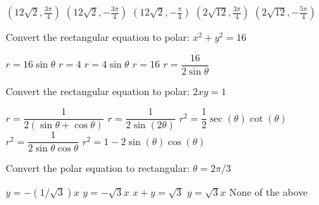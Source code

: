 \documentclass[11pt]{exam}
\begin{document}
\begin{questions}
\begin{minipage}{\linewidth}
\begin{choices}
	\choice $\left(12 \sqrt{2},\frac{3 \pi }{4}\right)$
	\CorrectChoice $\left(12 \sqrt{2},-\frac{3 \pi }{4}\right)$
	\choice $\left(12 \sqrt{2},-\frac{\pi }{4}\right)$
	\choice $\left(2 \sqrt{12},\frac{3 \pi }{4}\right)$
	\choice $\left(2 \sqrt{12},-\frac{5 \pi }{4}\right)$
\end{choices} \answerline

\end{minipage}

\begin{minipage}{\linewidth}



\question Convert the rectangular equation to polar: $x^2 + y^2 = 16$

\begin{choices}
	\choice $r = 16 \sin \theta$
	\CorrectChoice $r = 4$
	\choice $r = 4 \sin \theta$
	\choice $r=16$
	\choice $r = \dfrac{16}{2\sin\theta}$
\end{choices} \answerline
\end{minipage}

\begin{minipage}{\linewidth}



\question Convert the rectangular equation to polar: $2xy=1$

\begin{choices}
	\choice $r = \dfrac{1}{2(\sin\theta + \cos\theta)}$
	\choice $r = \dfrac{1}{2\sin(2\theta)}$
	\choice $r^2 = \dfrac{1}{2}\sec(\theta)\cot(\theta)$
	\CorrectChoice $r^2 = \dfrac{1}{2\sin\theta\cos\theta}$
	\choice $r^2 = 1 - 2\sin(\theta)\cos(\theta)$
\end{choices} \answerline
\end{minipage}

\begin{minipage}{\linewidth}


\question Convert the polar equation to rectangular: $\theta = 2\pi/3$

\begin{choices}
	\choice $y = -(1/\sqrt3) x$
	\correctchoice $y = -\sqrt3 x$
	\choice $x+y = \sqrt3$
	\choice $y = \sqrt3 x$
	\choice None of the above
\end{choices} \answerline


\end{minipage}

\begin{minipage}{\linewidth}



\end{minipage}
\end{questions}
\end{document}
